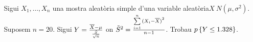 \begin{prob}
{Sigui $X_1,\ldots, X_n$ una mostra aleat\`oria simple d'una 
variable aleat\`oria\break\mbox{$X\ N(\mu,\sigma^2)$.} Suposem $n=20$. Sigui $Y={\overline{X}-\mu\over
{\tilde{S}\over \sqrt{n}}}$ on $\tilde{S}^2 ={\sum\limits_{i=1}^n {(X_i
-\overline{X})}^2\over n-1}$. Trobau $p\left\{Y\leq 1.328\right\}$.}
\end{prob}
